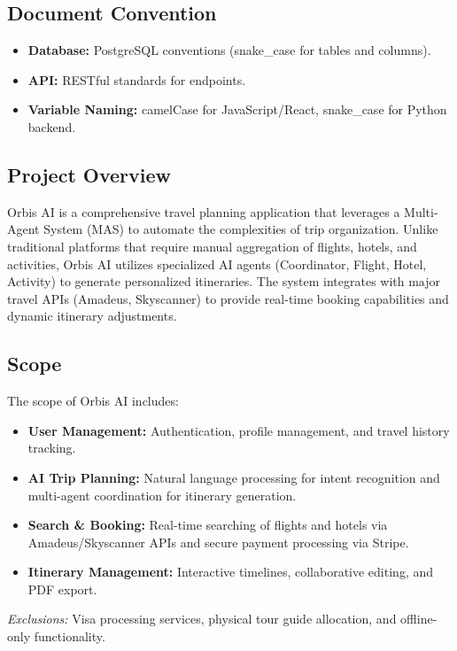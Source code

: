 \documentclass[11pt, a4paper]{article}
\begin{document}
\subsection{Document Convention}
\begin{itemize}
    \item \textbf{Database:} PostgreSQL conventions (snake\_case for tables and columns).
    \item \textbf{API:} RESTful standards for endpoints.
    \item \textbf{Variable Naming:} camelCase for JavaScript/React, snake\_case for Python backend.
\end{itemize}

\subsection{Project Overview}
Orbis AI is a comprehensive travel planning application that leverages a Multi-Agent System (MAS) to automate the complexities of trip organization. Unlike traditional platforms that require manual aggregation of flights, hotels, and activities, Orbis AI utilizes specialized AI agents (Coordinator, Flight, Hotel, Activity) to generate personalized itineraries. The system integrates with major travel APIs (Amadeus, Skyscanner) to provide real-time booking capabilities and dynamic itinerary adjustments.

\subsection{Scope}
The scope of Orbis AI includes:
\begin{itemize}
    \item \textbf{User Management:} Authentication, profile management, and travel history tracking.
    \item \textbf{AI Trip Planning:} Natural language processing for intent recognition and multi-agent coordination for itinerary generation.
    \item \textbf{Search \& Booking:} Real-time searching of flights and hotels via Amadeus/Skyscanner APIs and secure payment processing via Stripe.
    \item \textbf{Itinerary Management:} Interactive timelines, collaborative editing, and PDF export.
\end{itemize}
\textit{Exclusions:} Visa processing services, physical tour guide allocation, and offline-only functionality.

\end{document}
